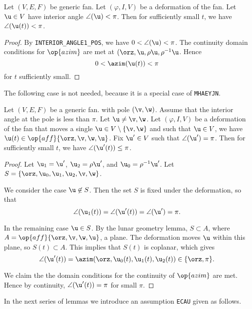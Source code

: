 \begin{lemma}[]
  Let $(V,E,F)$ be generic fan.
Let $(\varphi,I,V)$ be a deformation of the fan.
Let $\u\in V$ have interior angle $\angle(\u)<\pi$.  Then for sufficiently small $t$, we have
$\angle(\u(t))<\pi$.
\end{lemma}

\begin{proof}
By {\tt INTERIOR\_ANGLE1\_POS}, we have $0 < \angle(\u) <\pi$.  The continuity domain conditions for $\op{azim}$
are met at $(\orz,\u,\rho\u,\rho^{-1}\u$.   Hence
\[
0 < \azim(\u(t)) < \pi
\]
for $t$ sufficiently small.
\end{proof}

The following case is not needed, because it is a special case of {\tt MHAEYJN}.

\begin{lemma}[]
  Let $(V,E,F)$ be a generic fan.
 with pole $(\v,\w)$.  Assume that the interior angle at the pole
is less than $\pi$.  Let $\u\ne \v,\w$.  
Let $(\varphi,I,V)$ be a deformation of the fan that moves a single $\u\in V\setminus\{\v,\w\}$ and
 such that  $\u\in V$, we have $\u(t)\in \op{aff}\{\orz,\v,\w,\u\}$.
Fix $\u'\in V$ such that $\angle(\u')=\pi$.  Then for sufficiently small $t$, we have
$\angle(\u'(t))\le\pi$.
\end{lemma}

\begin{proof}  Let $\u_1=\u'$, $\u_2=\rho\u'$, and $\u_0 = \rho^{-1}\u'$.  
Let $S=\{\orz,\u_0,\u_1,\u_2,\v,\w\}$.

We consider the case $\u\not\in S$.  
Then the set $S$ is fixed under the deformation, so
that 
\[
\angle(\u_1(t)) = \angle(\u'(t)) =\angle(\u') =\pi.
\]

In the remaining case $\u\in S$.  
By the lunar geometry
lemma, $S \subset A$, where $A = \op{aff}\{\orz,\v,\w,\u\}$, a plane.
The deformation moves $\u$ within this plane, so $S(t)\subset A$.  This implies that $S(t)$ is coplanar,
which gives 
\[
\angle(\u'(t))=\azim(\orz,\u_0(t),\u_1(t),\u_2(t))\in \{\orz,\pi\}.
\]

We claim the the domain conditions for the continuity of $\op{azim}$ are met.  Hence
by continuity, $\angle(\u'(t))=\pi$ for small $\pi$.
\end{proof}

In the next series of lemmas we introduce an assumption {\tt ECAU} given as follows.

